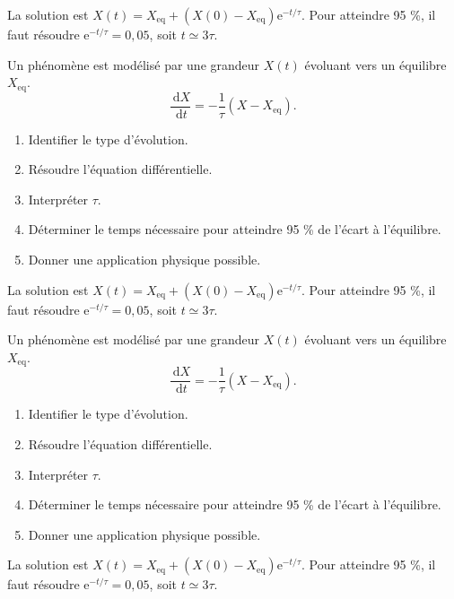 \documentclass[11pt,a4paper]{article}
\newcommand{\dd}{\,\mathrm d}
\newcommand{\e}{\mathrm e}
\begin{document}
\begin{corrigebox}[Correction 9]
La solution est $X(t)=X_{\mathrm{eq}}+(X(0)-X_{\mathrm{eq}})\e^{-t/\tau}$. Pour atteindre 95 \%, il faut résoudre $\e^{-t/\tau}=0{,}05$, soit $t\simeq3\tau$.
\end{corrigebox}

\begin{exercicebox}
Un phénomène est modélisé par une grandeur $X(t)$ évoluant vers un équilibre $X_{\mathrm{eq}}$.
\[
\frac{\dd X}{\dd t}=-\frac1\tau(X-X_{\mathrm{eq}}).
\]
\begin{enumerate}
  \item Identifier le type d'évolution.
  \item Résoudre l'équation différentielle.
  \item Interpréter $\tau$.
  \item Déterminer le temps nécessaire pour atteindre 95 \% de l'écart à l'équilibre.
  \item Donner une application physique possible.
\end{enumerate}
\end{exercicebox}

\begin{corrigebox}[Correction 10]
La solution est $X(t)=X_{\mathrm{eq}}+(X(0)-X_{\mathrm{eq}})\e^{-t/\tau}$. Pour atteindre 95 \%, il faut résoudre $\e^{-t/\tau}=0{,}05$, soit $t\simeq3\tau$.
\end{corrigebox}

\begin{exercicebox}
Un phénomène est modélisé par une grandeur $X(t)$ évoluant vers un équilibre $X_{\mathrm{eq}}$.
\[
\frac{\dd X}{\dd t}=-\frac1\tau(X-X_{\mathrm{eq}}).
\]
\begin{enumerate}
  \item Identifier le type d'évolution.
  \item Résoudre l'équation différentielle.
  \item Interpréter $\tau$.
  \item Déterminer le temps nécessaire pour atteindre 95 \% de l'écart à l'équilibre.
  \item Donner une application physique possible.
\end{enumerate}
\end{exercicebox}

\begin{corrigebox}[Correction 11]
La solution est $X(t)=X_{\mathrm{eq}}+(X(0)-X_{\mathrm{eq}})\e^{-t/\tau}$. Pour atteindre 95 \%, il faut résoudre $\e^{-t/\tau}=0{,}05$, soit $t\simeq3\tau$.
\end{corrigebox}
\end{document}
